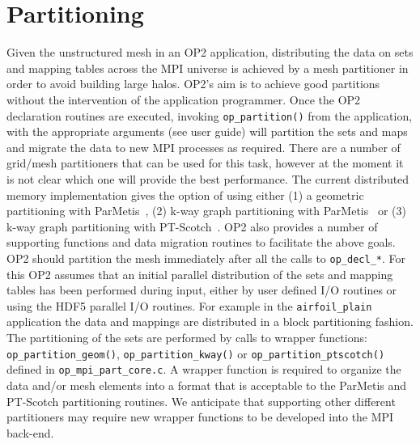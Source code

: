 \documentclass[11pt]{article}
\begin{document}
\newpage
\section{Partitioning}\label{sec/partitioning}
Given the unstructured mesh in an OP2 application, distributing the data on sets and mapping tables across the MPI
universe is achieved by a mesh partitioner in order to avoid building large halos. OP2's aim is to achieve good
partitions without the intervention of the application programmer. Once the OP2 declaration routines are executed,
invoking \texttt{op\_partition()} from the application, with the appropriate arguments (see user guide) will partition
the sets and maps and migrate the data to new MPI processes as required. There are a number of grid/mesh partitioners
that can be used for this task, however at the moment it is not clear which one will provide the best performance. The
current distributed memory implementation gives the option of using either (1) a geometric partitioning with
ParMetis~\cite{ParMETIS}, (2) k-way graph partitioning with ParMetis~\cite{ParMETIS} or (3) k-way graph partitioning
with PT-Scotch~\cite{PTScotch}. OP2 also provides a number of supporting functions and data migration routines to
facilitate the above goals.\\
\indent OP2 should partition the mesh immediately after all the calls to \texttt{op\_decl\_*}. For this OP2 assumes
that an initial parallel distribution of the sets and mapping tables has been performed during input, either by user
defined I/O routines or using the HDF5 parallel I/O routines. For example in the \texttt{airfoil\_plain} application the
data and mappings are distributed in a block partitioning fashion. The partitioning of the sets are performed by calls
to wrapper functions: \texttt{op\_partition\_geom()}, \texttt{op\_partition\_kway()} or
\texttt{op\_partition\_ptscotch()} defined in \texttt{op\_mpi\_part\_core.c}. A wrapper function is required to organize
the data and/or mesh elements into a format that is acceptable to the ParMetis and PT-Scotch partitioning routines. We
anticipate that supporting other different partitioners may require new wrapper functions to be developed into the MPI
back-end.

\end{document}

